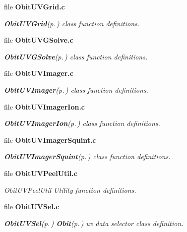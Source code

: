 \begin{CompactItemize}
\item 
file {\bf Obit\-UVGrid.c}
\begin{CompactList}\small\item\em {\bf Obit\-UVGrid}{\rm (p.\,\pageref{structObitUVGrid})} class function definitions. \item\end{CompactList}

\item 
file {\bf Obit\-UVGSolve.c}
\begin{CompactList}\small\item\em {\bf Obit\-UVGSolve}{\rm (p.\,\pageref{structObitUVGSolve})} class function definitions. \item\end{CompactList}

\item 
file {\bf Obit\-UVImager.c}
\begin{CompactList}\small\item\em {\bf Obit\-UVImager}{\rm (p.\,\pageref{structObitUVImager})} class function definitions. \item\end{CompactList}

\item 
file {\bf Obit\-UVImager\-Ion.c}
\begin{CompactList}\small\item\em {\bf Obit\-UVImager\-Ion}{\rm (p.\,\pageref{structObitUVImagerIon})} class function definitions. \item\end{CompactList}

\item 
file {\bf Obit\-UVImager\-Squint.c}
\begin{CompactList}\small\item\em {\bf Obit\-UVImager\-Squint}{\rm (p.\,\pageref{structObitUVImagerSquint})} class function definitions. \item\end{CompactList}

\item 
file {\bf Obit\-UVPeel\-Util.c}
\begin{CompactList}\small\item\em Obit\-UVPeel\-Util Utility function definitions. \item\end{CompactList}

\item 
file {\bf Obit\-UVSel.c}
\begin{CompactList}\small\item\em {\bf Obit\-UVSel}{\rm (p.\,\pageref{structObitUVSel})} {\bf Obit}{\rm (p.\,\pageref{structObit})} uv data selector class definition. \item\end{CompactList}


\end{CompactItemize}
